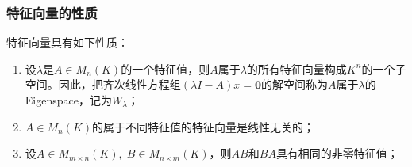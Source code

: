 \subsubsection{特征向量的性质}
\begin{property}\label{prop:Eigenvector}
	特征向量具有如下性质：
	\begin{enumerate}
		\item 设$\lambda$是$A\in M_{n}(K)$的一个特征值，则$A$属于$\lambda$的所有特征向量构成$K^n$的一个子空间。因此，把齐次线性方程组$(\lambda I-A)x=\mathbf{0}$的解空间称为$A$属于$\lambda$的\gls{Eigenspace}，记为$W_{\lambda}$；
		\item $A\in M_{n}(K)$的属于不同特征值的特征向量是线性无关的；
		\item 设$A\in M_{m\times n}(K),\;B\in M_{n\times m}(K)$，则$AB$和$BA$具有相同的非零特征值；
	\end{enumerate}
\end{property}
